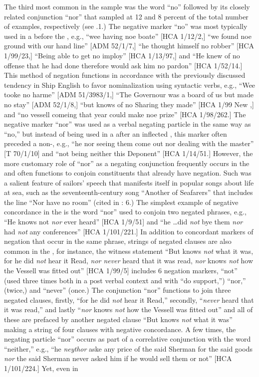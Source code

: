 The third most common  in the sample was the word “no” followed by its closely related conjunction “nor” that sampled at 12 and 8 percent of the total number of examples, respectively (see .1.) The negative marker “no” was most typically used in a  before the , e.g., “wee having noe boate” [HCA 1/12/2,] “we found noe ground with our hand line” [ADM 52/1/7,] “he thought himself no robber” [HCA 1/99/23,] “Being able to get no imploy” [HCA 1/13/97,] and “He knew of no offense that he had done therefore would ask him no pardon” [HCA 1/52/14.] This method of negation functions in accordance with the previously discussed tendency in Ship English to favor nominalization using syntactic verbs, e.g., “Wee tooke no harme” [ADM 51/3983/1,] “The Governour was a board of us but made no stay” [ADM 52/1/8,] “but knows of no Sharing they made” [HCA 1/99 New \citealt{Providence1722},] and “no vessell comeing that year could make noe prize” [HCA 1/98/262.] The negative marker “nor” was used as a verbal negating particle in the same way as “no,” but instead of being used in a  after an inflected , this marker often preceded a non-, e.g., “he nor seeing them come out nor dealing with the master” [T 70/1/10] and “not being neither this Deponent” [HCA 1/14/51.] However, the more customary role of “nor” as a negating conjunction frequently occurs in the  and often functions to conjoin constituents that already have negation. Such  was a salient feature of sailors’ speech that manifests itself in popular songs about life at sea, such as the seventeenth-century song “Another of Seafarers” that includes the line “Nor have no room” (cited in \citealt{Palmer1986}: 6.) The simplest example of negative concordance in the  is the word “nor” used to conjoin two negated  phrases, e.g., “He knows not \textit{nor} ever heard” [HCA 1/9/51] and “he …did \textit{not} bye them \textit{nor} had \textit{not} any conferences” [HCA 1/101/221.] In addition to concordant markers of negation that occur in the same phrase, strings of negated clauses are also common in the , for instance, the witness statement “But knows \textit{not} what it was, for he did \textit{not} hear it Read, \textit{nor never} heard that it was read, \textit{nor} knows \textit{not} how the Vessell was fitted out” [HCA 1/99/5] includes 6 negation markers, “not” (used three times both in a post verbal context and with “do support,”) “nor,” (twice,) and “never” (once.) The conjunction “nor” functions to join three negated clauses, firstly, “for he did \textit{not} hear it Read,” secondly, “\textit{never} heard that it was read,” and lastly “\textit{nor} knows \textit{not} how the Vessell was fitted out” and all of these are prefaced by another negated clause “But knows \textit{not} what it was” making a string of four clauses with negative concordance. A few times, the negating particle “nor” occurs as part of a correlative conjunction with the word “neither,” e.g., “he \textit{neythor} aske any price of the said Sherman for the said goods \textit{nor} the said Sherman never asked him if he would sell them or not” [HCA 1/101/224.] Yet, even in 